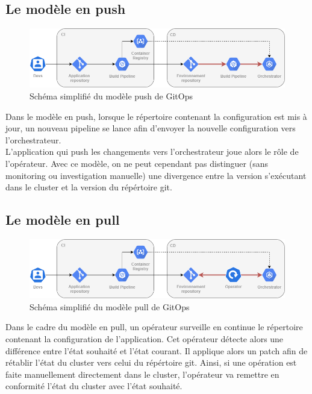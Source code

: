 \documentclass[11pt,fleqn]{book} %
\begin{document}
\subsection{Le modèle en push}
\begin{figure}[H]
\renewcommand{\figurename}{Schéma}
\hspace{-1cm}
\includegraphics[scale=0.6]{Pictures/CI-CD/push-model.png}
\captionsetup{margin=1.5cm,format=hang,justification=justified}
\caption[]{Schéma simplifié du modèle push de GitOps \newline}
\end{figure}

Dans le modèle en push, lorsque le répertoire contenant la configuration est mis à jour, un nouveau pipeline se lance afin d'envoyer la nouvelle configuration vers l'orchestrateur.\\

L'application qui push les changements vers l'orchestrateur joue alors le rôle de l'opérateur. Avec ce modèle, on ne peut cependant pas distinguer (sans monitoring ou investigation manuelle) une divergence entre la version s'exécutant dans le cluster et la version du répértoire git. 

\subsection{Le modèle en pull}
\begin{figure}[H]
\renewcommand{\figurename}{Schéma}
\hspace{-1cm}
\includegraphics[scale=0.6]{Pictures/CI-CD/pull-model.png}
\captionsetup{margin=1.5cm,format=hang,justification=justified}
\caption[]{Schéma simplifié du modèle pull de GitOps \newline}
\end{figure}

Dans le cadre du modèle en pull, un opérateur surveille en continue le répertoire contenant la configuration de l'application. Cet opérateur détecte alors une différence entre l'état souhaité et l'état courant. Il applique alors un patch afin de rétablir l'état du cluster vers celui du répértoire git. Ainsi, si une opération est faite manuellement directement dans le cluster, l'opérateur va remettre en conformité l'état du cluster avec l'état souhaité.
\end{document}
